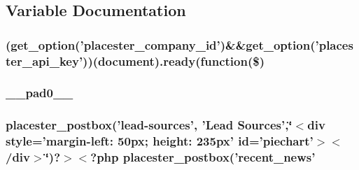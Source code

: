 \subsection{Variable Documentation}
\hypertarget{dashboard_8php_a73239abf40e2cb0fe837da6001b81be2}{
\subsubsection[{(get\_\-option('placester\_\-company\_\-id')\&\&get\_\-option('placester\_\-api\_\-key'))}]{ (get\_\-option('placester\_\-company\_\-id')\&\&get\_\-option('placester\_\-api\_\-key'))(document).ready(function(\$)}}
\label{df/d86/dashboard_8php_a73239abf40e2cb0fe837da6001b81be2}
\hypertarget{dashboard_8php_a8e01dcc96c43199448ee66f7c2ae8ea6}{
\subsubsection[{\_\-\_\-pad0\_\-\_\-}]{ {\bf \_\-\_\-pad0\_\-\_\-}}}
\label{df/d86/dashboard_8php_a8e01dcc96c43199448ee66f7c2ae8ea6}
\hypertarget{dashboard_8php_acc6df334008c440b57f23babb4031369}{
\subsubsection[{placester\_\-postbox}]{\setlength{\rightskip}{0pt plus 5cm}placester\_\-postbox('lead-\/sources', 'Lead Sources',\char`\"{}$<$div style='margin-\/left: 50px; height: 235px' id='piechart'$>$$<$/div$>$\char`\"{})?$>$$<$?php placester\_\-postbox('recent\_\-news'}}
\label{df/d86/dashboard_8php_acc6df334008c440b57f23babb4031369}
